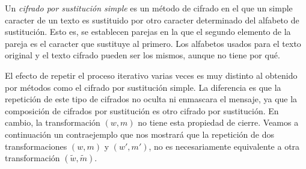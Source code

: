     \begin{definicion} \cite{libHelen}
        Un \textit{cifrado por sustitución simple} es un método de cifrado en el que un simple caracter de un texto es sustituido por otro caracter determinado del alfabeto de sustitución. Esto es, se establecen parejas en la que el segundo elemento de la pareja es el caracter que sustituye al primero. Los alfabetos usados para el texto original y el texto cifrado pueden ser los mismos, aunque no tiene por qué.
    \end{definicion}

    El efecto de repetir el proceso iterativo varias veces es muy distinto al obtenido por métodos como el cifrado por sustitución simple. La diferencia es que la repetición de este tipo de cifrados no oculta ni enmascara el mensaje, ya que la composición de cifrados por sustitución es otro cifrado por sustitución. En cambio, la transformación $(w,m)$ no tiene esta propiedad de cierre. Veamos a continuación un contraejemplo que nos mostrará que la repetición de dos transformaciones $(w, m)$ y $(w', m')$, no es necesariamente equivalente a otra transformación $(\widetilde{w}, \widetilde{m})$.

